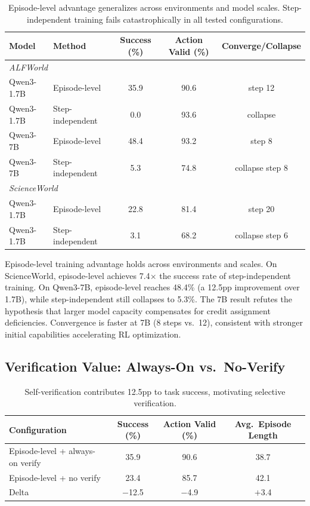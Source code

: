 \documentclass{article}
\begin{document}
\begin{table}[h]
\centering
\caption{Episode-level advantage generalizes across environments and model scales. Step-independent training fails catastrophically in all tested configurations.}
\begin{tabular}{llccc}
\toprule
Model & Method & Success (\%) & Action Valid (\%) & Converge/Collapse \\
\midrule
\multicolumn{5}{l}{\textit{ALFWorld}} \\
Qwen3-1.7B & Episode-level & 35.9 & 90.6 & step 12 \\
Qwen3-1.7B & Step-independent & 0.0 & 93.6 & collapse \\
Qwen3-7B & Episode-level & 48.4 & 93.2 & step 8 \\
Qwen3-7B & Step-independent & 5.3 & 74.8 & collapse step 8 \\
\midrule
\multicolumn{5}{l}{\textit{ScienceWorld}} \\
Qwen3-1.7B & Episode-level & 22.8 & 81.4 & step 20 \\
Qwen3-1.7B & Step-independent & 3.1 & 68.2 & collapse step 6 \\
\bottomrule
\end{tabular}
\label{tab:generalization}
\end{table}

Episode-level training advantage holds across environments and scales. On ScienceWorld, episode-level achieves 7.4$\times$ the success rate of step-independent training. On Qwen3-7B, episode-level reaches 48.4\% (a 12.5pp improvement over 1.7B), while step-independent still collapses to 5.3\%. The 7B result refutes the hypothesis that larger model capacity compensates for credit assignment deficiencies. Convergence is faster at 7B (8 steps vs.\ 12), consistent with stronger initial capabilities accelerating RL optimization.

\subsection{Verification Value: Always-On vs.\ No-Verify}

\begin{table}[h]
\centering
\caption{Self-verification contributes 12.5pp to task success, motivating selective verification.}
\begin{tabular}{lccc}
\toprule
Configuration & Success (\%) & Action Valid (\%) & Avg.\ Episode Length \\
\midrule
Episode-level + always-on verify & 35.9 & 90.6 & 38.7 \\
Episode-level + no verify & 23.4 & 85.7 & 42.1 \\
Delta & $-$12.5 & $-$4.9 & $+$3.4 \\
\bottomrule
\end{tabular}
\label{tab:noverify}
\end{table}
\end{document}

